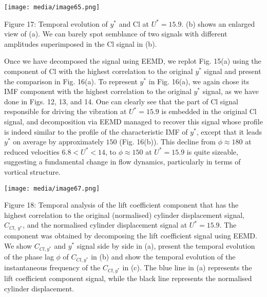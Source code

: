 \documentclass[]{article}
\begin{document}
\texttt{[image: media/image65.png]}

\protect\hypertarget{_Ref41047682}{}{\protect\hypertarget{_Toc41048840}{}{}}Figure
17: Temporal evolution of \(y^{*}\) and Cl at \(U^{*} = 15.9\). (b)
shows an enlarged view of (a). We can barely spot semblance of two
signals with different amplitudes superimposed in the Cl signal in (b).

Once we have decomposed the signal using EEMD, we replot Fig. 15(a)
using the component of Cl with the highest correlation to the original
\(y^{*}\) signal and present the comparison in Fig. 16(a). To represent
\(y^{*}\) in Fig. 16(a), we again chose its IMF component with the
highest correlation to the original \(y^{*}\) signal, as we have done in
Figs. 12, 13, and 14. One can clearly see that the part of Cl signal
responsible for driving the vibration at \(U^{*} = 15.9\) is embedded in
the original Cl signal, and decomposition via EEMD managed to recover
this signal whose profile is indeed similar to the profile of the
characteristic IMF of \(y^{*}\), except that it leads \(y^{*}\) on
average by approximately \(150\) (Fig. 16(b)). This decline from
\(\phi \approx 180\) at reduced velocities \(6.8 < U^{*} < 14\), to
\(\phi \approx 150\) at \(U^{*} = 15.9\) is quite sizeable, suggesting a
fundamental change in flow dynamics, particularly in terms of vortical
structure.

\texttt{[image: media/image67.png]}

\protect\hypertarget{_Ref41047933}{}{\protect\hypertarget{_Toc41048841}{}{}}Figure
18: Temporal analysis of the lift coefficient component that has the
highest correlation to the original (normalised) cylinder displacement
signal, \(C_{Cl,\ y^{*}}\), and the normalised cylinder displacement
signal at \(U^{*} = 15.9\). The component was obtained by decomposing
the lift coefficient signal using EEMD. We show \(C_{Cl,y^{*}}\) and
\(y^{*}\) signal side by side in (a), present the temporal evolution of
the phase lag \(\phi\) of \(C_{Cl,y^{*}}\) in (b) and show the temporal
evolution of the instantaneous frequency of the \(C_{Cl,y^{*}}\) in (c).
The blue line in (a) represents the lift coefficient component signal,
while the black line represents the normalised cylinder displacement.
\end{document}
